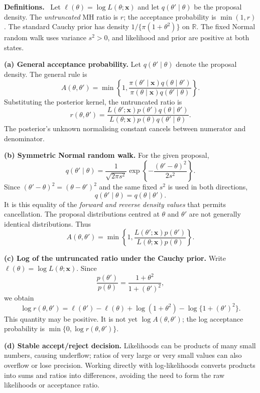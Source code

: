 \documentclass[11pt,a4paper]{article}
\newcommand{\given}{\mathrel{|}}
\newcommand{\xvec}{\boldsymbol{x}}
\newcommand{\studyheading}[1]{%
  \par\medskip\noindent\textcolor{statblue}{\textbf{#1.}}\ }
\begin{document}
\studyheading{Definitions}
Let $\ell(\theta)=\log L(\theta;\xvec)$ and let $q(\theta'\given\theta)$ be the proposal density.
The \emph{untruncated} MH ratio is $r$; the acceptance probability is $\min(1,r)$.
The standard Cauchy prior has density $1/\{\pi(1+\theta^2)\}$ on $\mathbb R$.
The fixed Normal random walk uses variance $s^2>0$, and likelihood and prior are positive at both states.

\textbf{(a) General acceptance probability.}
Let $q(\theta'\given\theta)$ denote the proposal density. The general rule is
\[
\boxed{
A(\theta,\theta')
=\min\left\{1,
\frac{\pi(\theta'\given\xvec)q(\theta\given\theta')}
     {\pi(\theta\given\xvec)q(\theta'\given\theta)}\right\}.
}
\]
Substituting the posterior kernel, the untruncated ratio is
\[
r(\theta,\theta')
=\frac{L(\theta';\xvec)p(\theta')q(\theta\given\theta')}
       {L(\theta;\xvec)p(\theta)q(\theta'\given\theta)}.
\]
The posterior's unknown normalising constant cancels between numerator
and denominator.

\textbf{(b) Symmetric Normal random walk.}
For the given proposal,
\[
q(\theta'\given\theta)
=\frac1{\sqrt{2\pi s^2}}
\exp\left\{-\frac{(\theta'-\theta)^2}{2s^2}\right\}.
\]
Since $(\theta'-\theta)^2=(\theta-\theta')^2$ and the same fixed $s^2$
is used in both directions,
\[
\boxed{q(\theta'\given\theta)=q(\theta\given\theta').}
\]
It is this equality of the \emph{forward and reverse density values}
that permits cancellation. The proposal distributions centred at
$\theta$ and $\theta'$ are not generally identical distributions.
Thus
\[
\boxed{
A(\theta,\theta')
=\min\left\{1,\frac{L(\theta';\xvec)p(\theta')}
                         {L(\theta;\xvec)p(\theta)}\right\}.
}
\]

\textbf{(c) Log of the untruncated ratio under the Cauchy prior.}
Write $\ell(\theta)=\log L(\theta;\xvec)$. Since
\[
\frac{p(\theta')}{p(\theta)}
=\frac{1+\theta^2}{1+(\theta')^2},
\]
we obtain
\[
\boxed{
\log r(\theta,\theta')
=\ell(\theta')-\ell(\theta)
+\log(1+\theta^2)-\log\{1+(\theta')^2\}.
}
\]
This quantity may be positive. It is not yet $\log A(\theta,\theta')$;
the log acceptance probability is $\min\{0,\log r(\theta,\theta')\}$.

\textbf{(d) Stable accept/reject decision.}
Likelihoods can be products of many small numbers, causing underflow;
ratios of very large or very small values can also overflow or lose
precision. Working directly with log-likelihoods converts products into
sums and ratios into differences, avoiding the need to form the raw
likelihoods or acceptance ratio.
\end{document}
